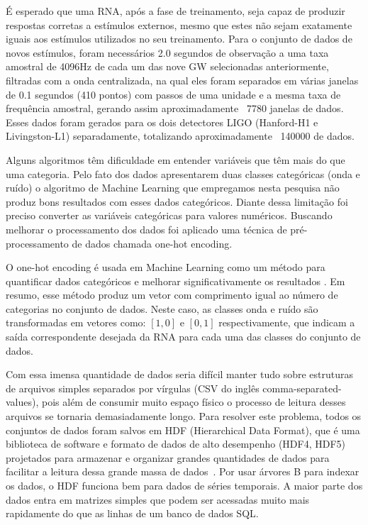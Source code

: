 É esperado que uma RNA, após a fase de treinamento, seja capaz de produzir respostas corretas a estímulos externos, mesmo que estes não sejam exatamente iguais aos estímulos utilizados no seu treinamento. Para o conjunto de dados de novos estímulos, foram necessários 2.0 segundos de observação a uma taxa amostral de 4096Hz de cada um das nove GW selecionadas anteriormente, filtradas com a onda centralizada, na qual eles foram separados em várias janelas de 0.1 segundos (410 pontos) com passos de uma unidade e a mesma taxa de frequência amostral, gerando assim aproximadamente ~7780 janelas de dados. Esses dados foram gerados para os dois detectores LIGO (Hanford-H1 e Livingston-L1) separadamente, totalizando aproximadamente ~140000 de dados.

Alguns algoritmos têm dificuldade em entender variáveis que têm mais do que uma categoria. Pelo fato dos dados apresentarem duas classes categóricas (onda e ruído) o algoritmo de Machine Learning que empregamos nesta pesquisa não produz bons resultados com esses dados categóricos. Diante dessa limitação foi preciso converter as variáveis categóricas para valores numéricos. Buscando melhorar o processamento dos dados foi aplicado uma técnica de pré-processamento de dados chamada one-hot encoding. 

O one-hot encoding é usada em Machine Learning como um método para quantificar dados categóricos e melhorar significativamente os resultados \cite{sarkar2017practical}. Em resumo, esse método produz um vetor com comprimento igual ao número de categorias no conjunto de dados. Neste caso, as classes onda e ruído são transformadas em vetores como: $[1,0]$ e $[0,1]$ respectivamente, que indicam a saída correspondente desejada da RNA para cada uma das classes do conjunto de dados.

Com essa imensa quantidade de dados seria difícil manter tudo sobre estruturas de arquivos simples separados por vírgulas (CSV do inglês comma-separated-values), pois além de consumir muito espaço físico o processo de leitura desses arquivos se tornaria demasiadamente longo. Para resolver este problema, todos os conjuntos de dados foram salvos em HDF (Hierarchical Data Format), que é uma biblioteca de software e formato de dados de alto desempenho (HDF4, HDF5) projetados para armazenar e organizar grandes quantidades de dados para facilitar a leitura dessa grande massa de dados~\cite{hdf}. Por usar árvores B para indexar os dados, o HDF funciona bem para dados de séries temporais. A maior parte dos dados entra em matrizes simples que podem ser acessadas muito mais rapidamente do que as linhas de um banco de dados SQL. 

